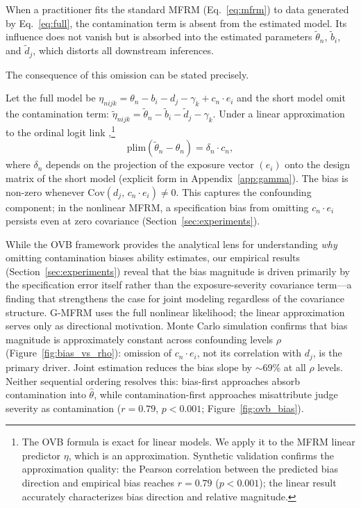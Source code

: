 When a practitioner fits the standard MFRM (Eq.~\ref{eq:mfrm}) to data generated by Eq.~\ref{eq:full}, the contamination term is absent from the estimated model. Its influence does not vanish but is absorbed into the estimated parameters $\tilde{\theta}_n$, $\tilde{b}_i$, and $\tilde{d}_j$, which distorts all downstream inferences.

The consequence of this omission can be stated precisely.

\begin{observation}
\label{obs:ovb}
Let the full model be $\eta_{nijk} = \theta_n - b_i - d_j - \gamma_k + c_n \cdot e_i$ and the short model omit the contamination term: $\tilde{\eta}_{nijk} = \tilde{\theta}_n - \tilde{b}_i - \tilde{d}_j - \gamma_k$. Under a linear approximation to the ordinal logit link \citep{wooldridge2010, angrist2009mostly},\footnote{The OVB formula is exact for linear models. We apply it to the MFRM linear predictor $\eta$, which is an approximation. Synthetic validation confirms the approximation quality: the Pearson correlation between the predicted bias direction and empirical bias reaches $r = 0.79$ ($p < 0.001$); the linear result accurately characterizes bias direction and relative magnitude.}
\begin{equation}
\label{eq:ovb}
\mathrm{plim}(\tilde{\theta}_n - \theta_n) = \delta_n \cdot c_n,
\end{equation}
where $\delta_n$ depends on the projection of the exposure vector $(e_i)$ onto the design matrix of the short model (explicit form in Appendix~\ref{app:gamma}). The bias is non-zero whenever $\mathrm{Cov}(d_j,\, c_n \cdot e_i) \neq 0$. This captures the confounding component; in the nonlinear MFRM, a specification bias from omitting $c_n \cdot e_i$ persists even at zero covariance (Section~\ref{sec:experiments}).
\end{observation}

While the OVB framework provides the analytical lens for understanding \emph{why} omitting contamination biases ability estimates, our empirical results (Section~\ref{sec:experiments}) reveal that the bias magnitude is driven primarily by the specification error itself rather than the exposure-severity covariance term---a finding that strengthens the case for joint modeling regardless of the covariance structure. G-MFRM uses the full nonlinear likelihood; the linear approximation serves only as directional motivation. Monte Carlo simulation confirms that bias magnitude is approximately constant across confounding levels $\rho$ (Figure~\ref{fig:bias_vs_rho}): omission of $c_n \cdot e_i$, not its correlation with $d_j$, is the primary driver. Joint estimation reduces the bias slope by ${\sim}$69\% at all $\rho$ levels. Neither sequential ordering resolves this: bias-first approaches \citep{cyclicjudge2026} absorb contamination into $\hat{\theta}$, while contamination-first approaches \citep{dcr2025} misattribute judge severity as contamination ($r = 0.79$, $p < 0.001$; Figure~\ref{fig:ovb_bias}).

